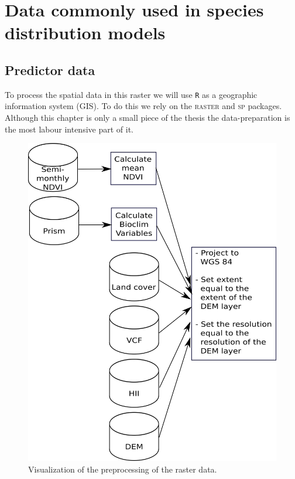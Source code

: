 \chapter{Data commonly used in species distribution models}
\label{ch:DataCommonlyUsedInSpeciesDistributionModels}
\section{Predictor data}
To process the spatial data in this raster we will use \texttt{R} as a geographic information system (GIS). To do this we rely on the \textsc{raster} \parencite{raster} and \textsc{sp} \parencite{sp} packages. Although this chapter is only a small piece of the thesis the data-preparation is the most labour intensive part of it. 


\begin{figure}[!htb]
\centering
\includegraphics[scale=0.5]{VectorGraphics/DataScheme.png}
\caption{\label{fig:DataCommonlyUsedInSpeciesDistributionModels:DataScheme}Visualization of the preprocessing of the raster data.}
\end{figure}

